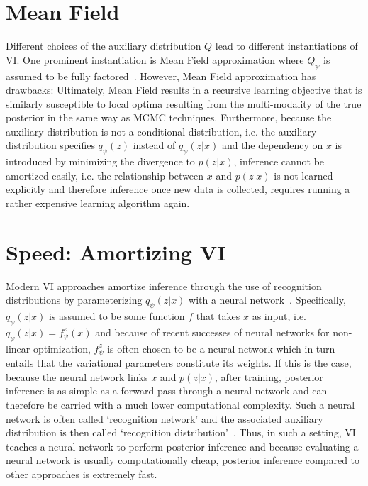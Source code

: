 \documentclass[11pt]{cmuthesis} %
\begin{document}
\section{Mean Field}
Different choices of the auxiliary distribution $Q$ lead to different instantiations of VI. One prominent instantiation is Mean Field approximation where $Q_\psi$ is assumed to be fully factored~\cite{ghahramani1996factorial,jaakkola1998improving}. However, Mean Field approximation has drawbacks: Ultimately, Mean Field results in a recursive learning objective that is similarly susceptible to local optima resulting from the multi-modality of the true posterior in the same way as MCMC techniques. Furthermore, because the auxiliary distribution is not a conditional distribution, i.e. the auxiliary distribution specifies $q_\psi(z)$ instead of $q_\psi(z|x)$ and the dependency on $x$ is introduced by minimizing the divergence to $p(z|x)$, inference cannot be amortized easily, i.e. the relationship between $x$ and $p(z|x)$ is not learned explicitly and therefore inference once new data is collected, requires running a rather expensive learning algorithm again.
\section{Speed: Amortizing VI}
Modern VI approaches amortize inference through the use of recognition distributions by parameterizing $q_\psi(z|x)$ with a neural network~\cite{kingma2013auto,mnih2014neural}. Specifically, $q_\psi(z|x)$ is assumed to be some function $f$ that takes $x$ as input, i.e. $q_\psi(z|x) = f^z_\psi(x)$ and because of recent successes of neural networks for non-linear optimization, $f^z_\psi$ is often chosen to be a neural network which in turn entails that the variational parameters constitute its weights. If this is the case, because the neural network links $x$ and $p(z|x)$, after training, posterior inference is as simple as a forward pass through a neural network and can therefore be carried with a much lower computational complexity. Such a neural network is often called `recognition network' and the associated auxiliary distribution is then called `recognition distribution'~\cite{kingma2013auto}. Thus, in such a setting, VI teaches a neural network to perform posterior inference and because evaluating a neural network is usually computationally cheap, posterior inference compared to other approaches is extremely fast.
\end{document}
